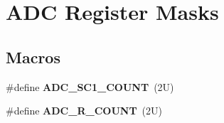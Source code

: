 \hypertarget{group___a_d_c___register___masks}{}\section{A\+DC Register Masks}
\label{group___a_d_c___register___masks}
\subsection*{Macros}
\begin{DoxyCompactItemize}
\item 
\mbox{\label{group___a_d_c___register___masks_gad1b5275cc9fbdba08614fca93c5e30ef}} 
\#define {\bfseries A\+D\+C\+\_\+\+S\+C1\+\_\+\+C\+O\+U\+NT}~(2\+U)
\item 
\mbox{\label{group___a_d_c___register___masks_ga2017fd646769acfc9ad3fab489690612}} 
\#define {\bfseries A\+D\+C\+\_\+\+R\+\_\+\+C\+O\+U\+NT}~(2\+U)
\end{DoxyCompactItemize}
